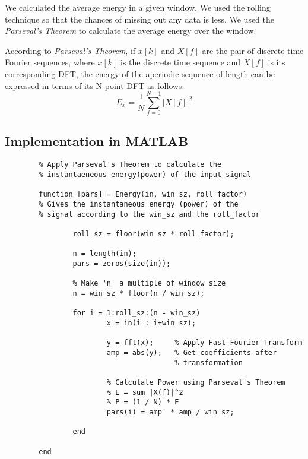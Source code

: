 \documentclass[report.tex]{subfiles}
\begin{document}
        We calculated the average energy in a given window. We used the rolling
        technique so that the chances of missing out any data is less. We used
        the \emph{Parseval's Theorem} to calculate the average energy over the
        window.

        According to \emph{Parseval's Theorem}, if $x[k]$ and $X[f]$ are the
        pair of discrete time Fourier sequences, where $x[k]$ is the discrete
        time sequence and $X[f]$ is its corresponding DFT, the energy of the
        aperiodic sequence of length can be expressed in terms of its N-point
        DFT as follows:
        $$
        E_x = \frac{1}{N} \sum_{f = 0}^{N - 1} \bigg | X[f] \bigg |^2
        $$

        \subsection{Implementation in MATLAB}
        \begin{lstlisting}
        % Apply Parseval's Theorem to calculate the
        % instantaeneous energy(power) of the input signal

        function [pars] = Energy(in, win_sz, roll_factor)
        % Gives the instantaneous energy (power) of the
        % signal according to the win_sz and the roll_factor

                roll_sz = floor(win_sz * roll_factor);
                
                n = length(in);
                pars = zeros(size(in));
                
                % Make 'n' a multiple of window size
                n = win_sz * floor(n / win_sz);
                
                for i = 1:roll_sz:(n - win_sz)
                        x = in(i : i+win_sz);
                        
                        y = fft(x);     % Apply Fast Fourier Transform
                        amp = abs(y);   % Get coefficients after 
                                        % transformation

                        % Calculate Power using Parseval's Theorem
                        % E = sum |X(f)|^2
                        % P = (1 / N) * E
                        pars(i) = amp' * amp / win_sz;
                        
                end

        end
        \end{lstlisting}
        
\end{document}

